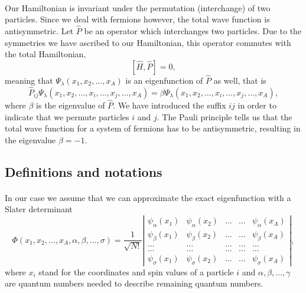 \documentclass[%
twoside,                 %
final,                   %
10pt]{article}
\begin{document}
\paragraph{}
Our Hamiltonian is invariant under the permutation (interchange) of two particles.
Since we deal with fermions however, the total wave function is antisymmetric.
Let $\hat{P}$ be an operator which interchanges two particles.
Due to the symmetries we have ascribed to our Hamiltonian, this operator commutes with the total Hamiltonian,
\[
[\hat{H},\hat{P}] = 0,
 \]
meaning that $\Psi_{\lambda}(x_1, x_2, \dots , x_A)$ is an eigenfunction of 
$\hat{P}$ as well, that is
\[
\hat{P}_{ij}\Psi_{\lambda}(x_1, x_2, \dots,x_i,\dots,x_j,\dots,x_A)=
\beta\Psi_{\lambda}(x_1, x_2, \dots,x_i,\dots,x_j,\dots,x_A),
\]
where $\beta$ is the eigenvalue of $\hat{P}$. We have introduced the suffix $ij$ in order to indicate that we permute particles $i$ and $j$.
The Pauli principle tells us that the total wave function for a system of fermions
has to be antisymmetric, resulting in the eigenvalue $\beta = -1$.



\subsection*{Definitions and notations}

\paragraph{}
In our case we assume that  we can approximate the exact eigenfunction with a Slater determinant
\begin{equation}
   \Phi(x_1, x_2,\dots ,x_A,\alpha,\beta,\dots, \sigma)=\frac{1}{\sqrt{N!}}
\left| \begin{array}{ccccc} \psi_{\alpha}(x_1)& \psi_{\alpha}(x_2)& \dots & \dots & \psi_{\alpha}(x_A)\\
                            \psi_{\beta}(x_1)&\psi_{\beta}(x_2)& \dots & \dots & \psi_{\beta}(x_A)\\  
                            \dots & \dots & \dots & \dots & \dots \\
                            \dots & \dots & \dots & \dots & \dots \\
                     \psi_{\sigma}(x_1)&\psi_{\sigma}(x_2)& \dots & \dots & \psi_{\sigma}(x_A)\end{array} \right|, \label{eq:HartreeFockDet}
\end{equation}
where  $x_i$  stand for the coordinates and spin values of a particle $i$ and $\alpha,\beta,\dots, \gamma$ 
are quantum numbers needed to describe remaining quantum numbers.
\end{document}
